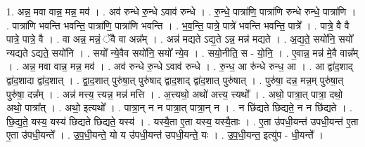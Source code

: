 \documentclass[17pt]{extarticle}
\begin{document}
1. अन्न॒ मवा वान्न॒ मन्न॒ मव॑ । . अव॑ रुन्धे रु॒न्धे ऽवाव॑ रुन्धे । . रु॒न्धे॒ पात्रा॑णि॒ पात्रा॑णि रुन्धे रुन्धे॒ पात्रा॑णि । . पात्रा॑णि भवन्ति भवन्ति॒ पात्रा॑णि॒ पात्रा॑णि भवन्ति । . भ॒व॒न्ति॒ पात्रे॒ पात्रे॑ भवन्ति भवन्ति॒ पात्रे᳚ । . पात्रे॒ वै वै पात्रे॒ पात्रे॒ वै । . वा अन्न॒ मन्नं॒ ॅवै वा अन्न᳚म् । . अन्न॑ मद्यते ऽद्य॒ते ऽन्न॒ मन्न॑ मद्यते । . अ॒द्य॒ते॒ सयो॑नि॒ सयो᳚ न्यद्यते ऽद्यते॒ सयो॑नि । . सयो᳚ न्ये॒वैव सयो॑नि॒ सयो᳚ न्ये॒व । . सयो॒नीति॒ स - यो॒नि॒ । . ए॒वान्न॒ मन्न॑ मे॒वै वान्न᳚म् । . अन्न॒ मवा वान्न॒ मन्न॒ मव॑ । . अव॑ रुन्धे रु॒न्धे ऽवाव॑ रुन्धे । . रु॒न्ध॒ आ रु॑न्धे रुन्ध॒ आ । . आ द्वा॑द॒शाद् द्वा॑द॒शादा द्वा॑द॒शात् । . द्वा॒द॒शात् पुरु॑षा॒त् पुरु॑षाद् द्वाद॒शाद् द्वा॑द॒शात् पुरु॑षात् । . पुरु॑षा॒ दन्न॒ मन्न॒म् पुरु॑षा॒त् पुरु॑षा॒ दन्न᳚म् । . अन्न॑ मत्त्य॒ त्त्यन्न॒ मन्न॑ मत्ति । . अ॒त्त्यथो॒ अथो॑ अत्त्य॒ त्त्यथो᳚ । . अथो॒ पात्रा॒त् पात्रा॒ दथो॒ अथो॒ पात्रा᳚त् । . अथो॒ इत्यथो᳚ । . पात्रा॒न् न न पात्रा॒त् पात्रा॒न् न । . न छि॑द्यते छिद्यते॒ न न छि॑द्यते । . छि॒द्य॒ते॒ यस्य॒ यस्य॑ छिद्यते छिद्यते॒ यस्य॑ । . यस्यै॒ता ए॒ता यस्य॒ यस्यै॒ताः । . ए॒ता उ॑पधी॒यन्त॑ उपधी॒यन्त॑ ए॒ता ए॒ता उ॑पधी॒यन्ते᳚ । . उ॒प॒धी॒यन्ते॒ यो य उ॑पधी॒यन्त॑ उपधी॒यन्ते॒ यः । . उ॒प॒धी॒यन्त॒ इत्यु॑प - धी॒यन्ते᳚ । \newline
\end{document}
